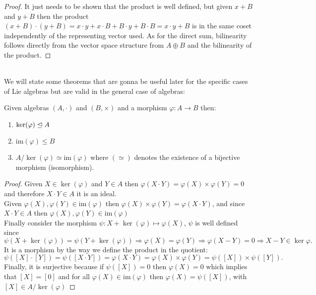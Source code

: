 \begin{proof}
	It just needs to be shown that the product is well defined, but given $x+B$ and $y+B$ then the product $(x+B)\cdot(y+B)=x\cdot y + x\cdot B + B\cdot y + B\cdot B = x\cdot y+B$ is in the same coset independently of the representing vector used. As for the direct sum, bilinearity follows directly from the vector space structure from $A\oplus B$ and the bilinearity of the product.
\end{proof}\\
We will state some theorems that are gonna be useful later for the specific cases of Lie algebras but are valid in the general case of algebras:\\
\begin{prop}
Given algebras $(A,\cdot)$ and $(B,\times)$ and a morphism $\varphi:A\rightarrow B$ then: 
\begin{enumerate}[label=\alph*.]
	\item $\ker(\varphi) \trianglelefteq A$
	\item $\text{im}(\varphi) \le B$ 
	\item $A/\ker(\varphi) \simeq \text{im}(\varphi)$ where $(\simeq)$ denotes the existence of a bijective morphism (isomorphism).
\end{enumerate}	
\label{12isomorphism}
\end{prop}
\begin{proof}
	Given $X \in \ker(\varphi)$ and $Y \in A$ then $\varphi(X \cdot Y) = \varphi(X)\times \varphi(Y) = 0$ and therefore $X\cdot Y \in A$ it is an ideal.\\
	Given $\varphi(X),\varphi(Y) \in \text{im}(\varphi)$ then $\varphi(X) \times \varphi(Y) = \varphi(X\cdot Y)$, and since $X \cdot Y \in A$ then $\varphi(X),\varphi(Y) \in \text{im}(\varphi)$\\
	Finally consider the morphism $\psi: X+\ker(\varphi) \mapsto \varphi(X)$, $\psi$ is well defined since $$\psi(X+\ker(\varphi))=\psi(Y+\ker(\varphi)) \Rightarrow \varphi(X)=\varphi(Y) \Rightarrow \varphi(X-Y)=0 \Rightarrow X-Y \in \ker\varphi.$$
	It is a morphism by the way we define the product in the quotient: $$\psi([X]\cdot[Y]) = \psi([X \cdot Y]) = \varphi(X \cdot Y) = \varphi(X)\times \varphi(Y) = \psi([X])\times \psi([Y]).$$
	Finally, it is surjective because if $\psi([X])=0$ then $\varphi(X)=0$ which implies that $[X]=[0]$ and for all $\varphi(X) \in \text{im}(\varphi)$ then $\varphi(X) = \psi([X])$, with $[X] \in A/\ker(\varphi)$
\end{proof}\\
